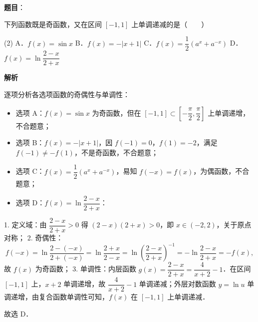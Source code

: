 \begin{answer}

\textbf{题目}：

下列函数既是奇函数，又在区间 $[-1, 1]$ 上单调递减的是\mbox{（　　）}

\begin{gkopts}(2)
\task A．$f(x) = \sin x$
\task B．$f(x) = -|x + 1|$
\task C．$f(x) = \dfrac{1}{2}(a^x + a^{-x})$
\task D．$f(x) = \ln \dfrac{2-x}{2+x}$
\end{gkopts}

\textbf{解析}

逐项分析各选项函数的奇偶性与单调性：
\begin{itemize}
\item 选项 A：$f(x) = \sin x$ 为奇函数，但在 $[-1, 1] \subset \left[-\dfrac{\pi}{2}, \dfrac{\pi}{2}\right]$ 上单调递增，不合题意；
\item 选项 B：$f(x) = -|x + 1|$，因 $f(-1) = 0$，$f(1) = -2$，满足 $f(-1) \neq -f(1)$，不是奇函数，不合题意；
\item 选项 C：$f(x) = \dfrac{1}{2}(a^x + a^{-x})$，易知 $f(-x) = f(x)$，为偶函数，不合题意；
\item 选项 D：$f(x) = \ln \dfrac{2-x}{2+x}$：
\end{itemize}
  1. 定义域：由 $\dfrac{2-x}{2+x} > 0$ 得 $(2-x)(2+x) > 0$，即 $x \in (-2, 2)$，关于原点对称；
  2. 奇偶性：
\nopagebreak[4]
\[
f(-x) = \ln \dfrac{2-(-x)}{2+(-x)} = \ln \dfrac{2+x}{2-x} = \ln \left(\dfrac{2-x}{2+x}\right)^{-1} = -\ln \dfrac{2-x}{2+x} = -f(x),
\]
  故 $f(x)$ 为奇函数；
  3. 单调性：内层函数 $g(x) = \dfrac{2-x}{2+x} = \dfrac{4}{x+2} - 1$．在区间 $[-1, 1]$ 上，$x+2$ 单调递增，故 $\dfrac{4}{x+2}-1$ 单调递减；外层对数函数 $y = \ln u$ 单调递增，由复合函数单调性可知，$f(x)$ 在 $[-1, 1]$ 上单调递减．

故选 D．


\end{answer}
